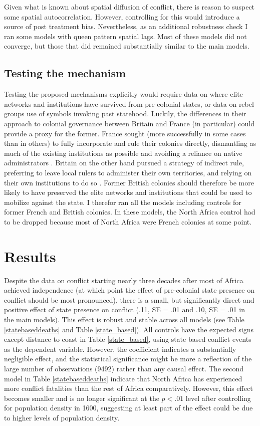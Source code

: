 \documentclass[12pt]{article}
\begin{document}
Given what is known about spatial diffusion of conflict, there is reason to
suspect some spatial autocorrelation. However, controlling for this would
introduce a source of post treatment bias. Nevertheless, as an additional
robustness check I ran some models with queen pattern spatial lags. Most of
these models did not converge, but those that did remained substantially similar
to the main models.

\subsection{Testing the mechanism}

Testing the proposed mechanisms explicitly would require data on where elite
networks and institutions have survived from pre-colonial states, or data on
rebel groups use of symbols invoking past statehood. Luckily, the differences in
their approach to colonial governance between Britain and France (in particular)
could provide a proxy for the former. France sought (more successfully in some
cases than in others) to fully incorporate and rule their colonies directly,
dismantling as much of the existing institutions as possible and avoiding a
reliance on native administrators \citep{Blanton_2001}. Britain on the other
hand pursued a strategy of indirect rule, preferring to leave local rulers to
administer their own territories, and relying on their own institutions to do so
\citep{Blanton_2001}. Former British colonies should therefore be more likely to
have preserved the elite networks and institutions that could be used to
mobilize against the state. I therefor ran all the models including controls for
former French and British colonies. In these models, the North Africa control
had to be dropped because most of North Africa were French colonies at some
point.

\section{Results}

Despite the data on conflict starting nearly three decades after most of Africa
achieved independence (at which point the effect of pre-colonial state presence
on conflict should be most pronounced), there is a small, but significantly
direct and positive effect of state presence on conflict (.11, SE = .01 and .10,
SE = .01 in the main models). This effect is robust and stable across all models
(see Table \ref{statebaseddeaths} and Table \ref{state_based}). All controls
have the expected signs except distance to coast in Table \ref{state_based},
using state based conflict events as the dependent variable. However, the
coefficient indicates a substantially negligible effect, and the statistical
significance might be more a reflection of the large number of observations
(9492) rather than any causal effect. The second model in Table
\ref{statebaseddeaths} indicate that North Africa has experienced more conflict
fatalities than the rest of Africa comparatively. However, this effect becomes
smaller and is no longer significant at the $ p < .01 $ level after controlling
for population density in 1600, suggesting at least part of the effect could be
due to higher levels of population density.
\end{document}
